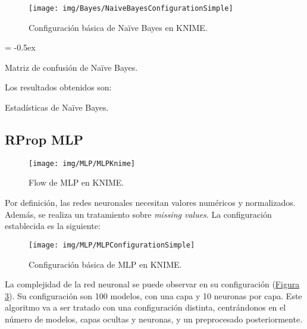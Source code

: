 \documentclass[paper=a4, fontsize=12pt]{article} %
\numberwithin{equation}{section} %
\numberwithin{figure}{section} %
\numberwithin{table}{section} %
\begin{document}
	\begin{figure}[H]
	  \centering
	  \texttt{[image: img/Bayes/NaiveBayesConfigurationSimple]}
	  \caption{Configuración básica de Naïve Bayes en KNIME.}
	  \label{config_Bayess}
	\end{figure}

	\extrarowheight = -0.5ex %
	\renewcommand{\arraystretch}{1.75} %
	\begin{table}[H]
		\begin{center}
		\end{center}
		\caption {Matriz de confusión de Naïve Bayes.}
		\label {mcBayess}
	\end{table}

	Los resultados obtenidos son:
	\begin{table}[H]
		\begin{center}
		\end{center}
		\caption {Estadísticas de Naïve Bayes.}
		\label {statisticsBayess}
	\end{table}

\subsection {RProp MLP}


	\begin{figure}[H]
	  \centering
	  \texttt{[image: img/MLP/MLPKnime]}
	  \caption{Flow de MLP en KNIME.}
	  \label{flow_NNs}
	\end{figure}

Por definición, las redes neuronales necesitan valores numéricos y normalizados. Además, se realiza un tratamiento sobre \textit{missing values}. La configuración establecida es la siguiente:

	\begin{figure}[H]
	  \centering
	  \texttt{[image: img/MLP/MLPConfigurationSimple]}
	  \caption{Configuración básica de MLP en KNIME.}
	  \label{config_NNs}
	\end{figure}

	La complejidad de la red neuronal se puede observar en su configuración (\hyperref[config_NNs]{Figura \ref*{config_NNs}}). Su configuración son 100 modelos, con una capa y 10 neuronas por capa. Este algoritmo va a ser tratado con una configuración distinta, centrándonos en el número de modelos, capas ocultas y neuronas, y un preprocesado posteriormente. 
\end{document}
